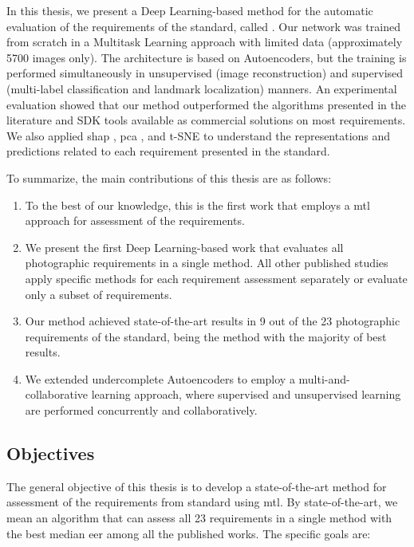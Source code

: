 In this thesis, we present a Deep Learning-based method for the automatic evaluation of the requirements of the \icao standard, called \methodname. Our network was trained from scratch in a Multitask Learning approach with limited data (approximately 5700 images only). The architecture is based on Autoencoders, but the training is performed simultaneously in unsupervised (image reconstruction) and supervised (multi-label classification and landmark localization) manners. An experimental evaluation showed that our method outperformed the algorithms presented in the literature and SDK tools available as commercial solutions on most requirements. We also applied \acf{shap} \citep{shap2018}, \acf{pca} \citep{pca}, and t-SNE \citep{tsne} to understand the representations and predictions related to each requirement presented in the \icao standard.
 
To summarize, the main contributions of this thesis are as follows:
\begin{enumerate}
\item To the best of our knowledge, this is the first work that employs a \acl{mtl} approach for assessment of the \icao requirements.
 
\item We present the first Deep Learning-based work that evaluates all photographic requirements in a single method. All other published studies apply specific methods for each requirement assessment separately or evaluate only a subset of requirements.
 
\item Our method achieved state-of-the-art results in 9 out of the 23 photographic requirements of the \icao standard, being the method with the majority of best results.
 
\item We extended undercomplete Autoencoders to employ a multi-and-collaborative learning approach, where supervised and unsupervised learning are performed concurrently and collaboratively.
\end{enumerate}
 
\subsection{Objectives}	
 
The general objective of this thesis is to develop a state-of-the-art method for assessment of the requirements from \icao standard using \acl{mtl}. By state-of-the-art, we mean an algorithm that can assess all 23 requirements in a single method with the best median \acs{eer} among all the published works. The specific goals are:
 
